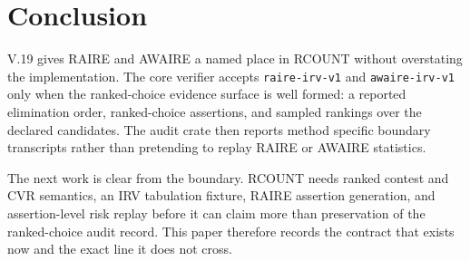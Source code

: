 \section{Conclusion}

V.19 gives RAIRE and AWAIRE a named place in RCOUNT without overstating the
implementation. The core verifier accepts \texttt{raire-irv-v1} and
\texttt{awaire-irv-v1} only when the ranked-choice evidence surface is well
formed: a reported elimination order, ranked-choice assertions, and sampled
rankings over the declared candidates. The audit crate then reports method
specific boundary transcripts rather than pretending to replay RAIRE or AWAIRE
statistics.

The next work is clear from the boundary. RCOUNT needs ranked contest and CVR
semantics, an IRV tabulation fixture, RAIRE assertion generation, and
assertion-level risk replay before it can claim more than preservation of the
ranked-choice audit record. This paper therefore records the contract that
exists now and the exact line it does not cross.

